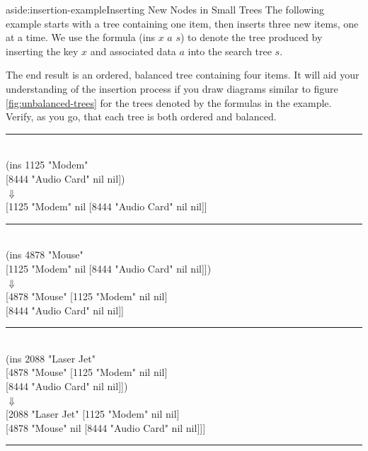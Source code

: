 \begin{aside}{aside:insertion-example}{Inserting New Nodes in Small Trees}
The following example starts with a tree containing one item,
then inserts three new items, one at a time.
We use the formula \textsf{(ins $x$ $a$ $s$)} to denote
the tree produced by inserting the key $x$ and associated
data $a$ into the search tree $s$.

The end result is an ordered,
balanced tree containing four items.
It will aid your understanding
of the insertion process if you draw diagrams similar to figure
\ref{fig:unbalanced-trees} for the trees denoted by the formulas in the example.
Verify, as you go, that each tree is both ordered and balanced.
\begin{center}
\begin{tabbing}
%
\vspace*{-1.5\topsep}
\rule{\textwidth}{0.5pt}
\vspace*{-\topsep}
%
\\
\textsf{(ins} \= \textsf{1125 "Modem" }\\
     \> \textsf{{[}8444 "Audio Card" nil nil{]})} \\
     \> $\Downarrow$ \\
\textsf{{[}1125 "Modem" nil {[}8444 "Audio Card" nil nil{]}{]}} \\
%
\vspace*{-1.5\topsep}
\rule{\textwidth}{0.5pt}%
\vspace*{-\topsep}
%
\\
\textsf{(ins} \= \textsf{4878 "Mouse"} \\
     \> \textsf{{[}1125 "Modem" nil {[}8444 "Audio Card" nil nil{]}{]})} \\
     \> $\Downarrow$ \\
\textsf{{[}4878 "Mouse"} \= \textsf{{[}1125 "Modem"      nil nil{]}}  \\
              \> \textsf{{[}8444 "Audio Card" nil nil{]}{]}} \\
%
\vspace*{-1.5\topsep}
\rule{\textwidth}{0.5pt}%
\vspace*{-\topsep}
%
\\
\textsf{(ins} \= \textsf{2088 "Laser Jet"} \\
     \> \textsf{{[}4878 "Mouse"} \= \textsf{{[}1125 "Modem" nil nil{]}} \\
     \>               \> \textsf{{[}8444 "Audio Card" nil nil{]}{]})} \\
     \> $\Downarrow$ \\
\textsf{{[}2088 "Laser Jet"} \= \textsf{{[}1125 "Modem" nil nil{]}} \\
                  \> \textsf{{[}4878 "Mouse" nil {[}8444 "Audio Card" nil nil{]}{]}{]}} \\
%
\vspace*{-1.5\topsep}
\rule{\textwidth}{0.5pt}%
\vspace*{-\topsep}
%
\end{tabbing}
\end{center}
\end{aside}

